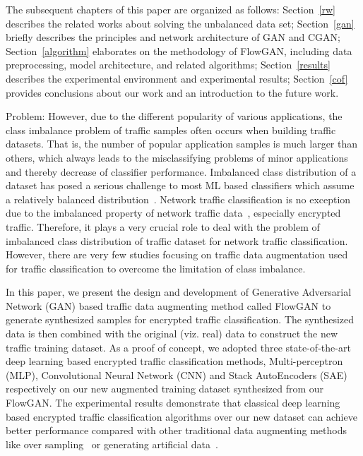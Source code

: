 \documentclass[conference]{IEEEtran}
\begin{document}
The subsequent chapters of this paper are organized as follows: Section~\ref{rw} describes the related works about solving the unbalanced data set; Section~\ref{gan} briefly describes the principles and network architecture of GAN and CGAN; Section~\ref{algorithm} elaborates on the methodology of FlowGAN, including data preprocessing, model architecture, and related algorithms; Section~\ref{results} describes the experimental environment and experimental results; Section~\ref{cof} provides conclusions about our work and an introduction to the future work.



{\color{red}Problem:} However, due to the different popularity of various applications, the class imbalance problem of traffic samples often occurs when building traffic datasets. That is, the number of popular application samples is much larger than others, which always leads to the misclassifying problems of minor applications and thereby decrease of classifier performance. Imbalanced class distribution of a dataset has posed a serious challenge to most ML based classifiers which assume a relatively balanced distribution~\cite{Japkowicz:2002}. Network traffic classification is no exception due to the imbalanced property of network traffic data~\cite{Vu2017,Vu2016}, especially encrypted traffic. Therefore, it plays a very crucial role to deal with the problem of imbalanced class distribution of traffic dataset for network traffic classification. However, there are very few studies focusing on traffic data augmentation used for traffic classification to overcome the limitation of class imbalance.

In this paper, we present the design and development of Generative Adversarial Network (GAN) based traffic data augmenting method called FlowGAN to generate synthesized samples for encrypted traffic classification. The synthesized data is then combined with the original (viz. real) data to construct the new traffic training dataset. As a proof of concept, we adopted three state-of-the-art deep learning based encrypted traffic classification methods, Multi-perceptron (MLP), Convolutional Neural Network (CNN) and Stack AutoEncoders (SAE) respectively on our new augmented training dataset synthesized from our FlowGAN. The experimental results demonstrate that classical deep learning based encrypted traffic classification algorithms over our new dataset can achieve better performance compared with  other traditional data augmenting methods like over sampling~\cite{ROS2004} or generating artificial data~\cite{SMOTE2002}.
\end{document}
